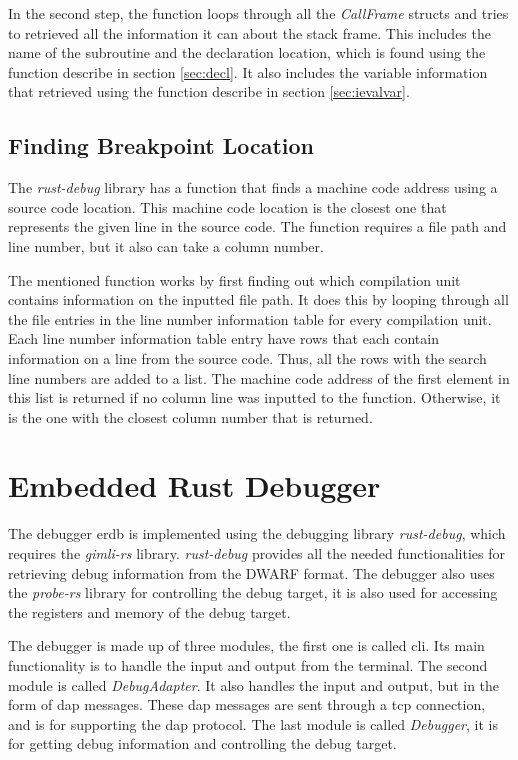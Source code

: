 In the second step, the function loops through all the \emph{CallFrame} structs and tries to retrieved all the information it can about the stack frame.
This includes the name of the subroutine and the declaration location, which is found using the function describe in section \ref{sec:decl}.
It also includes the variable information that retrieved using the function describe in section \ref{sec:ievalvar}.



\subsection{Finding Breakpoint Location}
The \emph{rust-debug} library has a function that finds a machine code address using a source code location.
This machine code location is the closest one that represents the given line in the source code.
The function requires a file path and line number, but it also can take a column number.


The mentioned function works by first finding out which compilation unit contains information on the inputted file path.
It does this by looping through all the file entries in the line number information table for every compilation unit.
Each line number information table entry have rows that each contain information on a line from the source code.
Thus, all the rows with the search line numbers are added to a list.
The machine code address of the first element in this list is returned if no column line was inputted to the function.
Otherwise, it is the one with the closest column number that is returned.




\section{Embedded Rust Debugger}
The debugger \acrfull{erdb} is implemented using the debugging library \emph{rust-debug}, which requires the \emph{gimli-rs} library.
\emph{rust-debug} provides all the needed functionalities for retrieving debug information from the \gls{DWARF} format.
The debugger also uses the \emph{probe-rs} library for controlling the debug target, it is also used for accessing the registers and memory of the debug target.


The debugger is made up of three modules, the first one is called \acrshort{cli}.
Its main functionality is to handle the input and output from the terminal.
The second module is called \emph{DebugAdapter}.
It also handles the input and output, but in the form of \gls{dap} messages.
These \gls{dap} messages are sent through a \acrshort{tcp} connection, and is for supporting the \gls{dap} protocol.
The last module is called \emph{Debugger}, it is for getting debug information and controlling the debug target.



